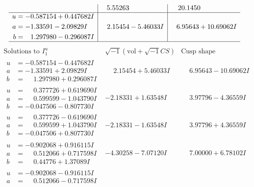\documentclass[1p]{elsarticle_modified}
\theoremstyle{definition}
\newcommand{\I}{\sqrt{-1}}
\begin{document}
$$\begin{array}{c|c|c}
 & \phantom{-}5.55263\phantom{ +0.000000I} & \phantom{-}20.1450\phantom{ +0.000000I} \\ \hline\begin{aligned}
u &= -0.587154 + 0.447682 I \\
a &= -1.33591 - 2.09829 I \\
b &= \phantom{-}1.297980 - 0.296087 I\end{aligned}
 & \phantom{-}2.15454 - 5.46033 I & \phantom{-}6.95643 + 10.69062 I\\
 \hline 
 \end{array}$$\newpage$$\begin{array}{c|c|c}  
\text{Solutions to }I^u_{1}& \I (\text{vol} + \sqrt{-1}CS) & \text{Cusp shape}\\
 \hline 
\begin{aligned}
u &= -0.587154 - 0.447682 I \\
a &= -1.33591 + 2.09829 I \\
b &= \phantom{-}1.297980 + 0.296087 I\end{aligned}
 & \phantom{-}2.15454 + 5.46033 I & \phantom{-}6.95643 - 10.69062 I \\ \hline\begin{aligned}
u &= \phantom{-}0.377726 + 0.619690 I \\
a &= \phantom{-}0.599599 - 1.043790 I \\
b &= -0.047506 - 0.807730 I\end{aligned}
 & -2.18331 + 1.63548 I & \phantom{-}3.97796 - 4.36559 I \\ \hline\begin{aligned}
u &= \phantom{-}0.377726 - 0.619690 I \\
a &= \phantom{-}0.599599 + 1.043790 I \\
b &= -0.047506 + 0.807730 I\end{aligned}
 & -2.18331 - 1.63548 I & \phantom{-}3.97796 + 4.36559 I \\ \hline\begin{aligned}
u &= -0.902068 + 0.916115 I \\
a &= \phantom{-}0.512066 + 0.717598 I \\
b &= \phantom{-}0.44776 + 1.37089 I\end{aligned}
 & -4.30258 - 7.07120 I & \phantom{-}7.00000 + 6.78102 I \\ \hline\begin{aligned}
u &= -0.902068 - 0.916115 I \\
a &= \phantom{-}0.512066 - 0.717598 I \\

\end{aligned}
\end{array}$$
\end{document}
